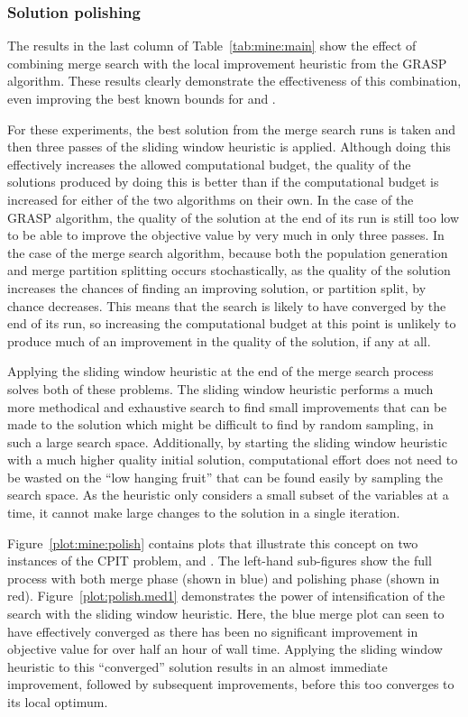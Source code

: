 \documentclass[preprint]{elsarticle}
\begin{document}
\subsubsection*{\textbf{Solution polishing}}
 
The results in the last column of Table~\ref{tab:mine:main} show the effect of combining merge search with the local improvement heuristic from the GRASP algorithm. These results clearly demonstrate the effectiveness of this combination, even improving the best known bounds for \dmine{} and \zucklarge{}. 

For these experiments, the best solution from the merge search runs is taken and then three passes of the sliding window heuristic is applied. Although doing this effectively increases the allowed computational budget, the quality of the solutions produced by doing this is better than if the computational budget is increased for either of the two algorithms on their own. In the case of the GRASP algorithm, the quality of the solution at the end of its run is still too low to be able to improve the objective value by very much in only three passes. In the case of the merge search algorithm, because both the population generation and merge partition splitting occurs stochastically, as the quality of the solution increases the chances of finding an improving solution, or partition split, by chance decreases. This means that the search is likely to have converged by the end of its run, so increasing the computational budget at this point is unlikely to produce much of an improvement in the quality of the solution, if any at all.

Applying the sliding window heuristic at the end of the merge search process solves both of these problems. The sliding window heuristic performs a much more methodical and exhaustive search to find small improvements that can be made to the solution which might be difficult to find by random sampling, in such a large search space. Additionally, by starting the sliding window heuristic with a much higher quality initial solution, computational effort does not need to be wasted on the ``low hanging fruit'' that can be found easily by sampling the search space. As the heuristic only considers a small subset of the variables at a time, it cannot make large changes to the solution in a single iteration. 

Figure~\ref{plot:mine:polish} contains plots that illustrate this concept on two instances of the CPIT problem, \zuckmed{} and \zucklarge{}. The left-hand sub-figures show the full process with both merge phase (shown in blue) and polishing phase (shown in red). Figure~\ref{plot:polish.med1} demonstrates the power of intensification of the search with the sliding window heuristic. Here, the blue merge plot can seen to have effectively converged as there has been no significant improvement in objective value for over half an hour of wall time. Applying the sliding window heuristic to this ``converged'' solution results in an almost immediate improvement, followed by subsequent improvements, before this too converges to its local optimum.
\end{document}
